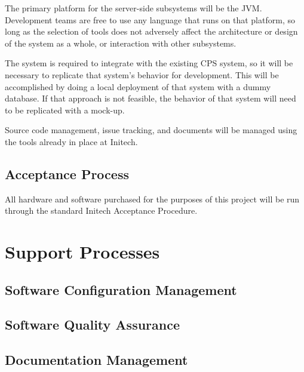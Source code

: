 \documentclass[11pt]{article}
\begin{document}
The primary platform for the server-side subsystems will be the JVM.  Development teams are free to
use any language that runs on that platform, so long as the selection of tools does not adversely
affect the architecture or design of the system as a whole, or interaction with other subsystems.

The system is required to integrate with the existing CPS system, so it will be necessary to
replicate that system's behavior for development.  This will be accomplished by doing a local
deployment of that system with a dummy database.  If that approach is not feasible, the behavior of
that system will need to be replicated with a mock-up.

Source code management, issue tracking, and documents will be managed using the tools already in
place at Initech.


\subsection{Acceptance Process}
All hardware and software purchased for the purposes of this project will be run through the
standard Initech Acceptance Procedure.



\section{Support Processes}

\subsection{Software Configuration Management}

\subsection{Software Quality Assurance}

\subsection{Documentation Management}
\end{document}
